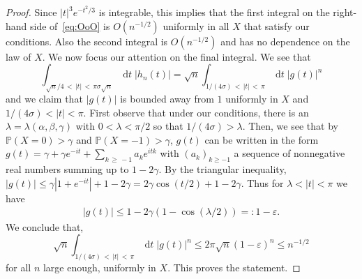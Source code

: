 \documentclass[AHL,Unicode,longabstracts,published]{cedram}
\renewcommand{\P}{\mathbb{P}}
\DeclareMathOperator{\dtseq}{d\mathit{t}}
\begin{document}
\begin{proof}
Since $|t|^3 e^{-t^2/3}$ is integrable, this implies that the first integral on the right-hand side of~\eqref{eq:OoO} is $O(n^{-1/2})$ uniformly in all $X$ that satisfy our conditions. Also the second integral is $O(n^{-1/2})$ and has no dependence on the law of $X$. We now focus our attention on the final integral. We see that
\[
\int_{\sqrt{n}/4\,<\,|t|\,<\,\pi\sigma \sqrt{n }} \dtseq |h_{n}(t)|= \sqrt{n}\int_{1/(4\sigma)\,<\,|t|\,<\,\pi} \dtseq |g(t)|^n
\]
and we claim that $|g(t)|$ is bounded away from $1$ uniformly in $X$ and $1/(4\sigma)<|t|<\pi$. First observe that under our conditions, there is an $\lambda=\lambda(\alpha,\beta,\gamma)$ with $0<\lambda<\pi/2$ so that $1/(4\sigma)>\lambda$. Then, we see that by $\P(X=0)>\gamma$ and $\P(X=-1)>\gamma$, $g(t)$ can be written in the form $g(t)=\gamma+\gamma e^{-it}+ \sum_{k\,\ge\,-1} a_{k }e^{itk}$ with $(a_{k})_{k\ge -1}$ a sequence of nonnegative real numbers summing up to $1-2\gamma$. By the triangular inequality, $|g(t)| \leq \gamma|1+e^{- it}|+1-2\gamma= 2\gamma\cos(t/2)+1-2\gamma$. Thus for $\lambda<|t|<\pi$ we have
\begin{align*}
|g(t)| \le 1-2\gamma(1-\cos(\lambda/2))=:1-\varepsilon.
\end{align*}
We conclude that,
\[
\sqrt{n}\int_{1/(4\sigma)\,<\,|t|\,<\,\pi} \dtseq |g(t)|^n\leq 2\pi \sqrt{n} (1-\varepsilon)^n\leq n^{-1/2}
\]
for all $n$ large enough, uniformly in $X$. This proves the statement.
\end{proof}
\end{document}
